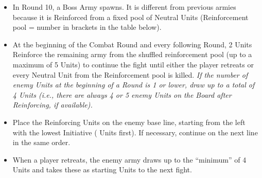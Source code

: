 \begin{multicols}{2}
\begin{itemize}
  \item In Round 10, a Boss Army spawns. It is different from previous armies because it is Reinforced from a fixed pool of Neutral Units (Reinforcement pool = number in brackets in the table below).
  \item At the beginning of the  Combat Round and every following Round, 2 Units Reinforce the remaining army from the shuffled reinforcement pool (up to a maximum of 5 Units) to continue the fight until either the player retreats or every Neutral Unit from the Reinforcement pool is killed. \textit{If the number of enemy Units at the beginning of a Round is 1 or lower, draw up to a total of 4 Units (i.e., there are always 4 or 5 enemy Units on the Board after Reinforcing, if available).}
  \item Place the Reinforcing Units on the enemy base line, starting from the left with the lowest Initiative ( Units first). If necessary, continue on the next line in the same order.
  \vspace*{\fill}\columnbreak
  \item When a player retreats, the enemy army draws up to the ``minimum'' of 4 Units and takes these as starting Units to the next fight.
  \vspace*{\fill}
\end{itemize}

\end{multicols}


